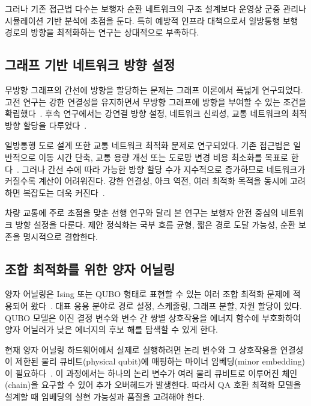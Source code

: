 \documentclass[twocolumn,a4paper]{article}
\begin{document}
그러나 기존 접근법 다수는 보행자 순환 네트워크의 구조 설계보다 운영상 군중 관리나 시뮬레이션 기반 분석에 초점을 둔다. 특히 예방적 인프라 대책으로서 일방통행 보행 경로의 방향을 최적화하는 연구는 상대적으로 부족하다.

\subsection{그래프 기반 네트워크 방향 설정} \label{subsec:related_graph}

무방향 그래프의 간선에 방향을 할당하는 문제는 그래프 이론에서 폭넓게 연구되었다. 고전 연구는 강한 연결성을 유지하면서 무방향 그래프에 방향을 부여할 수 있는 조건을 확립했다~\cite{robbins1939theorem}. 후속 연구에서는 강연결 방향 설정, 네트워크 신뢰성, 교통 네트워크의 최적 방향 할당을 다루었다~\cite{chung1985strongly, roberts1988optimal, roberts1994optimal}.

일방통행 도로 설계 또한 교통 네트워크 최적화 문제로 연구되었다. 기존 접근법은 일반적으로 이동 시간 단축, 교통 용량 개선 또는 도로망 변경 비용 최소화를 목표로 한다~\cite{drezner1997selecting, huang2020bi, huang2020model}. 그러나 간선 수에 따라 가능한 방향 할당 수가 지수적으로 증가하므로 네트워크가 커질수록 계산이 어려워진다. 강한 연결성, 아크 역전, 여러 최적화 목적을 동시에 고려하면 복잡도는 더욱 커진다~\cite{burkard1999minimum, bangjensen2023complexity}.

차량 교통에 주로 초점을 맞춘 선행 연구와 달리 본 연구는 보행자 안전 중심의 네트워크 방향 설정을 다룬다. 제안 정식화는 국부 흐름 균형, 짧은 경로 도달 가능성, 순환 보존을 명시적으로 결합한다.

\subsection{조합 최적화를 위한 양자 어닐링} \label{subsec:related_qa}

양자 어닐링은 Ising 또는 QUBO 형태로 표현할 수 있는 여러 조합 최적화 문제에 적용되어 왔다~\cite{qa_for_optimize}. 대표 응용 분야로 경로 설정, 스케줄링, 그래프 분할, 자원 할당이 있다. QUBO 모델은 이진 결정 변수와 변수 간 쌍별 상호작용을 에너지 함수에 부호화하여 양자 어닐러가 낮은 에너지의 후보 해를 탐색할 수 있게 한다.

현재 양자 어닐링 하드웨어에서 실제로 실행하려면 논리 변수와 그 상호작용을 연결성이 제한된 물리 큐비트(physical qubit)에 매핑하는 마이너 임베딩(minor embedding)이 필요하다~\cite{minor_embedding_inQA2, minor_embedding_inQA}. 이 과정에서는 하나의 논리 변수가 여러 물리 큐비트로 이루어진 체인(chain)을 요구할 수 있어 추가 오버헤드가 발생한다. 따라서 QA 호환 최적화 모델을 설계할 때 임베딩의 실현 가능성과 품질을 고려해야 한다.
\end{document}
